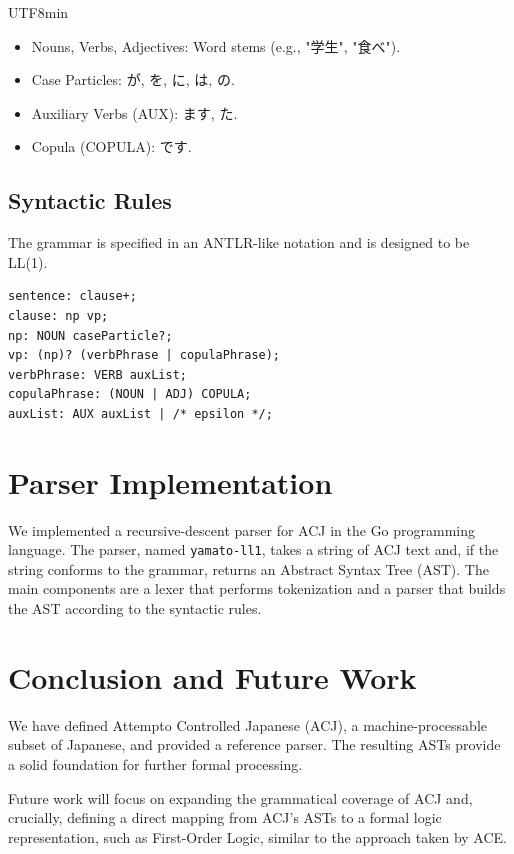\documentclass{article}
\begin{document}
\begin{CJK}{UTF8}{min}
\begin{itemize}
  \item Nouns, Verbs, Adjectives: Word stems (e.g., "学生", "食べ").
  \item Case Particles: が, を, に, は, の.
  \item Auxiliary Verbs (AUX): ます, た.
  \item Copula (COPULA): です.
\end{itemize}

\subsection{Syntactic Rules}
The grammar is specified in an ANTLR-like notation and is designed to be LL(1).
\begin{verbatim}
sentence: clause+;
clause: np vp;
np: NOUN caseParticle?;
vp: (np)? (verbPhrase | copulaPhrase);
verbPhrase: VERB auxList;
copulaPhrase: (NOUN | ADJ) COPULA;
auxList: AUX auxList | /* epsilon */;
\end{verbatim}

\section{Parser Implementation}
We implemented a recursive-descent parser for ACJ in the Go programming language. The parser, named \texttt{yamato-ll1}, takes a string of ACJ text and, if the string conforms to the grammar, returns an Abstract Syntax Tree (AST). The main components are a lexer that performs tokenization and a parser that builds the AST according to the syntactic rules.

\section{Conclusion and Future Work}
We have defined Attempto Controlled Japanese (ACJ), a machine-processable subset of Japanese, and provided a reference parser. The resulting ASTs provide a solid foundation for further formal processing.

Future work will focus on expanding the grammatical coverage of ACJ and, crucially, defining a direct mapping from ACJ's ASTs to a formal logic representation, such as First-Order Logic, similar to the approach taken by ACE.

\end{CJK}
\end{document}
